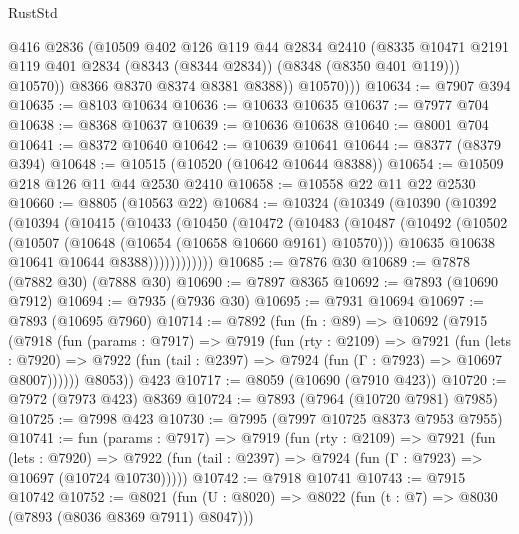 \begin{lexlean}{RustStd}
\begin{coremodule}
{\begin{coremodule}
{{{{{{{{{{{{{{{{{{{{{{{{{{{{{{{{{{{{{{{{{{{{{{{{{{                @416
                @2836
                (@10509
                  @402
                  @126
                  @119
                  @44
                  @2834
                  @2410
                  (@8335
                    @10471
                    @2191
                    @119
                    @401
                    @2834
                    (@8343 (@8344 @2834))
                    (@8348 (@8350 @401 @119)))
                  @10570))
              @8366
              @8370
              @8374
              @8381
              @8388))
          @10570)))
@10634 := @7907 @394
@10635 := @8103 @10634
@10636 := @10633 @10635
@10637 := @7977 @704
@10638 := @8368 @10637
@10639 := @10636 @10638
@10640 := @8001 @704
@10641 := @8372 @10640
@10642 := @10639 @10641
@10644 := @8377 (@8379 @394)
@10648 := @10515 (@10520 (@10642 @10644 @8388))
@10654 := @10509 @218 @126 @11 @44 @2530 @2410
@10658 := @10558 @22 @11 @22 @2530
@10660 := @8805 (@10563 @22)
@10684 := @10324
    (@10349
      (@10390
        (@10392
          (@10394
            (@10415
              (@10433
                (@10450
                  (@10472
                    (@10483
                      (@10487
                        (@10492
                          (@10502
                            (@10507 (@10648 (@10654 (@10658 @10660 @9161) @10570)))
                            @10635
                            @10638
                            @10641
                            @10644
                            @8388))))))))))))
@10685 := @7876 @30
@10689 := @7878 (@7882 @30) (@7888 @30)
@10690 := @7897 @8365
@10692 := @7893 (@10690 @7912)
@10694 := @7935 (@7936 @30)
@10695 := @7931 @10694
@10697 := @7893 (@10695 @7960)
@10714 := @7892
    (fun (fn : @89) =>
    @10692
      (@7915
        (@7918
          (fun (params : @7917) =>
          @7919
            (fun (rty : @2109) =>
            @7921
              (fun (lets : @7920) =>
              @7922 (fun (tail : @2397) => @7924 (fun (Γ : @7923) => @10697 @8007))))))
        @8053))
    @423
@10717 := @8059 (@10690 (@7910 @423))
@10720 := @7972 (@7973 @423) @8369
@10724 := @7893 (@7964 (@10720 @7981) @7985)
@10725 := @7998 @423
@10730 := @7995 (@7997 @10725 @8373 @7953 @7955)
@10741 := fun (params : @7917) =>
  @7919
    (fun (rty : @2109) =>
    @7921
      (fun (lets : @7920) =>
      @7922 (fun (tail : @2397) => @7924 (fun (Γ : @7923) => @10697 (@10724 @10730)))))
@10742 := @7918 @10741
@10743 := @7915 @10742
@10752 := @8021 (fun (U : @8020) => @8022 (fun (t : @7) => @8030 (@7893 (@8036 @8369 @7911) @8047)))
}}}}}}}}}}}}}}}}}}}}}}}}}}}}}}}}}}}}}}}}}}}}}}}}}}
\end{coremodule}}
\end{coremodule}
\end{lexlean}
